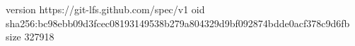 version https://git-lfs.github.com/spec/v1
oid sha256:bc98ebb09d3fcec08193149538b279a804329d9bf092874bdde0acf378c9d6fb
size 327918
